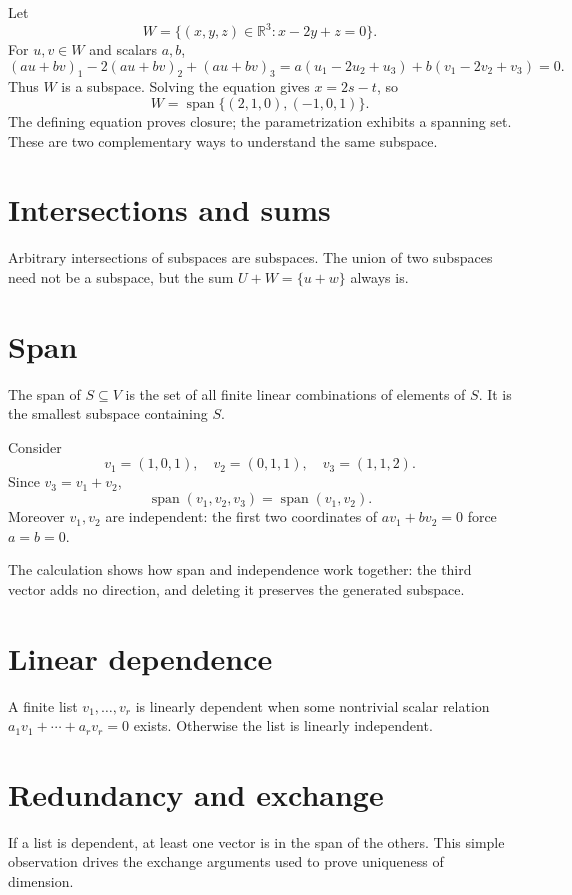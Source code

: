 \begin{example}\label{ex:i02-expand-01}
Let
\[
W=\{(x,y,z)\in\mathbb R^3:x-2y+z=0\}.
\]
For \(u,v\in W\) and scalars \(a,b\),
\[
(au+bv)_1-2(au+bv)_2+(au+bv)_3
=a(u_1-2u_2+u_3)+b(v_1-2v_2+v_3)=0.
\]
Thus \(W\) is a subspace. Solving the equation gives
\(x=2s-t\), so
\[
W=\operatorname{span}\{(2,1,0),(-1,0,1)\}.
\]
The defining equation proves closure; the parametrization exhibits a spanning
set. These are two complementary ways to understand the same subspace.
\end{example}
\section{Intersections and sums}
Arbitrary intersections of subspaces are subspaces. The union of two subspaces need not be a subspace, but the sum $U+W=\{u+w\}$ always is.

\section{Span}
The span of $S\subseteq V$ is the set of all finite linear combinations of elements of $S$. It is the smallest subspace containing $S$.


\begin{example}\label{ex:i02-expand-02}
Consider
\[
v_1=(1,0,1),\quad v_2=(0,1,1),\quad v_3=(1,1,2).
\]
Since \(v_3=v_1+v_2\),
\[
\operatorname{span}(v_1,v_2,v_3)=\operatorname{span}(v_1,v_2).
\]
Moreover \(v_1,v_2\) are independent: the first two coordinates of
\(av_1+bv_2=0\) force \(a=b=0\).

The calculation shows how span and independence work together: the third vector
adds no direction, and deleting it preserves the generated subspace.
\end{example}
\section{Linear dependence}
A finite list $v_1,\ldots,v_r$ is linearly dependent when some nontrivial scalar relation $a_1v_1+\cdots+a_rv_r=0$ exists. Otherwise the list is linearly independent.

\section{Redundancy and exchange}
If a list is dependent, at least one vector is in the span of the others. This simple observation drives the exchange arguments used to prove uniqueness of dimension.

